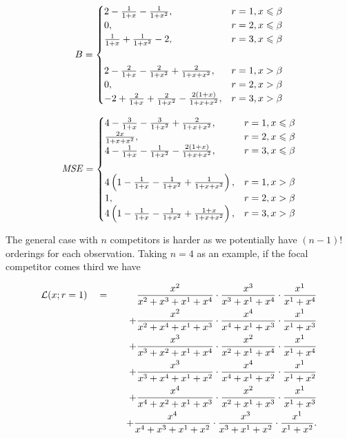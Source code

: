 \documentclass[article]{ajs}  %
\begin{document}
\begin{eqnarray}\label{bias}
B = \begin{cases}
2-\frac{1}{1+x}-\frac{1}{1+x^2}, & r=1, x\leqslant\beta\\
0,                               & r=2, x\leqslant\beta\\
\frac{1}{1+x}+\frac{1}{1+x^2}-2, & r=3, x\leqslant\beta\\
2-\frac{2}{1+x}-\frac{2}{1+x^2}+\frac{2}{1+x+x^2},       & r=1, x>\beta\rule{0mm}{10mm}\\
0,                                                       & r=2, x>\beta\\
-2+\frac{2}{1+x}+\frac{2}{1+x^2}-\frac{2(1+x)}{1+x+x^2}, & r=3, x>\beta
\end{cases}
\end{eqnarray}

\begin{eqnarray}\label{MSE}
\mathit{MSE} = \begin{cases}
  4-\frac{3}{1+x}-\frac{3}{1+x^2}+\frac{2}{1+x+x^2}                 , &r=1, x\leqslant\beta\\
\frac{2x}{1+x+x^2}                                                  , &r=2, x\leqslant\beta\\
 4-\frac{1}{1+x} - \frac{1}{1+x^2} -\frac{2(1+x)}{1+x+x^2}          , &r=3, x\leqslant\beta\\
4\left(1-\frac{1}{1+x}-\frac{1}{1+x^2}+\frac{1}{1+x+x^2}\right)     , &r=1, x > \beta\rule{0mm}{10mm}\\
1                                                                   , &r=2, x > \beta\\
4\left(1-\frac{1}{1+x} - \frac{1}{1+x^2} +\frac{1+x}{1+x+x^2}\right), &r=3, x > \beta\\
\end{cases}
\end{eqnarray}

The general case with $n$ competitors is harder as we potentially have
$(n-1)!$ orderings for each observation.  Taking $n=4$ as an example,
if the focal competitor comes third we have

\newcommand{\plackett}[4]{
\frac{x^{#1}}{x^{#1} + x^{#2} + x^{#3} + x^{#4}}\cdot
\frac{x^{#2}}{         x^{#2} + x^{#3} + x^{#4}}\cdot
\frac{x^{#3}}{                  x^{#3} + x^{#4}}}

\begin{eqnarray}
\mathcal{L}(x;r=1)
\quad &=& \quad\hphantom{+}
            \plackett{2}{3}{1}{4}\nonumber\\
&{}&\quad + \plackett{2}{4}{1}{3}\nonumber\\
&{}&\quad + \plackett{3}{2}{1}{4}\nonumber\\
&{}&\quad + \plackett{3}{4}{1}{2}\nonumber\\
&{}&\quad + \plackett{4}{2}{1}{3}\nonumber\\
&{}&\quad + \plackett{4}{3}{1}{2}.\label{requalfour}
\end{eqnarray}
\end{document}
